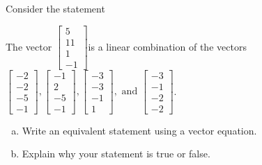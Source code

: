 
\begin{exerciseStatement}


Consider the statement 
\begin{center}\begin{minipage}{0.8\textwidth}
 The vector \( \left[\begin{array}{c}
5 \\
11 \\
1 \\
-1
\end{array}\right] \)is a linear combination of the vectors \( \left[\begin{array}{c}
-2 \\
-2 \\
-5 \\
-1
\end{array}\right] , \left[\begin{array}{c}
-1 \\
2 \\
-5 \\
-1
\end{array}\right] , \left[\begin{array}{c}
-3 \\
-3 \\
-1 \\
1
\end{array}\right] , \text{ and } \left[\begin{array}{c}
-3 \\
-1 \\
-2 \\
-2
\end{array}\right] \). 
\end{minipage}\end{center}
    


\begin{enumerate}[(a)]
\item  Write an equivalent statement using a vector equation.
\item  Explain why your statement is true or false.
\end{enumerate}
    
\end{exerciseStatement}
    
